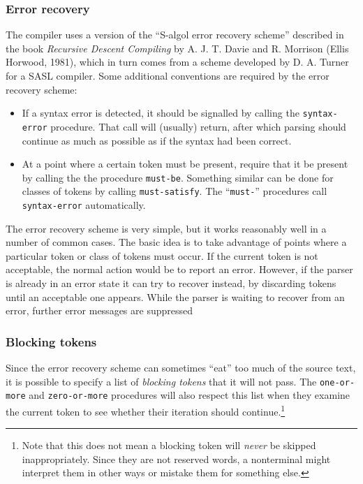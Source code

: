 \subsubsection{Error recovery}

The compiler uses a version of the ``S-algol error recovery scheme''
described in the book {\em Recursive Descent Compiling\/} by A. J. T.
Davie and R.  Morrison (Ellis Horwood, 1981), which in turn comes from
a scheme developed by D. A. Turner for a SASL compiler.
%
Some additional conventions are required by the error recovery
scheme:

\begin{itemize}
\item If a syntax error is detected, it should be signalled by
      calling the {\tt syntax-error} procedure.  That call will
      (usually) return, after which parsing should continue as
      much as possible as if the syntax had been correct.
\item At a point where a certain token must be present, require that
      it be present by calling the the procedure {\tt must-be}.
      Something similar can be done for classes of tokens by calling
      {\tt must-satisfy}.
      The ``{\tt must-}'' procedures call {\tt syntax-error}
      automatically.
\end{itemize}

The error recovery scheme is very simple, but it works reasonably well
in a number of common cases.  The basic idea is to take advantage of
points where a particular token or class of tokens must occur.  If the
current token is not acceptable, the normal action would be to report
an error.  However, if the parser is already in an error state it can
try to recover instead, by discarding tokens until an acceptable one
appears.  While the parser is waiting to recover from an error,
further error messages are suppressed


\subsubsection{Blocking tokens}

Since the error recovery scheme can sometimes ``eat'' too much of
the source text, it is possible to specify a list of {\em blocking
tokens\/} that it will not pass.  The {\tt one-or-more} and
{\tt zero-or-more} procedures will also respect this list when
they examine the current token to see whether their iteration
should continue.\footnote{Note that this does not mean a blocking
token will {\em never\/} be skipped inappropriately.  Since they
are not reserved words, a nonterminal might interpret them in other 
ways or mistake them for something else.}

